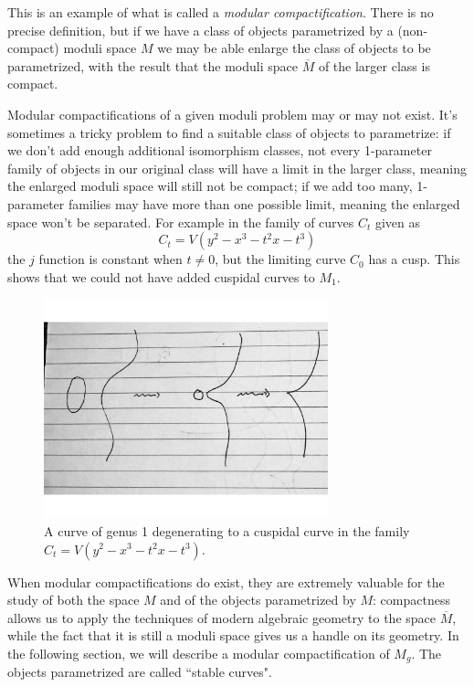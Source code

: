 This is an example of what is called a \emph{modular compactification}. There is no precise definition, but if we have a class of objects parametrized by a (non-compact) moduli space $M$ we may be able enlarge the class of objects to be parametrized, with the result that the moduli space $\overline M$ of the larger class is compact. 

Modular compactifications of a given moduli problem may or may not exist. It's sometimes a tricky problem to find a suitable class of objects to parametrize: if we don't add enough additional isomorphism classes, not every 1-parameter family of objects in our original class will have a limit in the larger class, meaning the enlarged moduli space will still not be compact; if we add too many,  1-parameter families may have more than one possible limit, meaning the enlarged space won't be separated. For example in the family
 of curves $C_t$ given as
$$
C_t = V(y^2 -x^3 - t^2x - t^3)
$$
the $j$ function is constant when $t\neq 0$, but  the limiting curve $C_0$ has a cusp. This shows that
we could not have added cuspidal curves to $M_1$.

\begin{figure}\label {Fig7.A}
\begin{center}
\centerline {\includegraphics[height=2.5in]{"Fig7.A.pdf"}}
\caption{A curve of genus 1 degenerating to a cuspidal curve in the family $
C_t = V(y^2 -x^3 - t^2x - t^3)$.}
\label{default}
\end{center}
\end{figure}


 When modular compactifications do exist, they are extremely valuable for the study of both the space $M$ and of the objects parametrized by $M$: compactness allows us to apply the techniques of modern algebraic geometry to the space $\overline M$, while the fact that it is still a moduli space gives us a handle on its geometry. In the following section, we will describe a modular compactification of $M_g$. The objects parametrized are called ``stable curves". 

